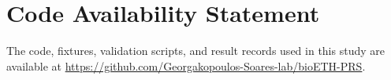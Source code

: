 \documentclass[10pt]{article}
\begin{document}
\section*{Code Availability Statement}
The code, fixtures, validation scripts, and result records used in this study are available
at \url{https://github.com/Georgakopoulos-Soares-lab/bioETH-PRS}.



\end{document}
